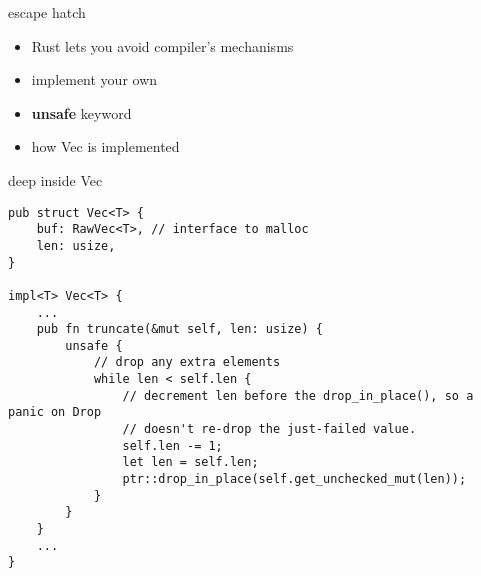 
\begin{frame}{escape hatch}
    \begin{itemize}
    \item Rust lets you avoid compiler's mechanisms
    \item implement your own
    \item \textbf{unsafe} keyword
    \item how Vec is implemented
    \end{itemize}
\end{frame}

\begin{frame}[fragile,label=insideVec]{deep inside Vec}
\begin{verbatim}
pub struct Vec<T> {
    buf: RawVec<T>, // interface to malloc
    len: usize,
}

impl<T> Vec<T> {
    ...
    pub fn truncate(&mut self, len: usize) {
        unsafe {
            // drop any extra elements
            while len < self.len {
                // decrement len before the drop_in_place(), so a panic on Drop
                // doesn't re-drop the just-failed value.
                self.len -= 1;
                let len = self.len;
                ptr::drop_in_place(self.get_unchecked_mut(len));
            }
        }
    }
    ...
}
\end{verbatim}
\end{frame}


